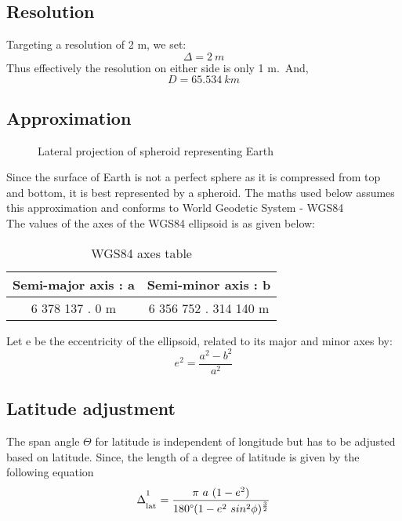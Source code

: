 \documentclass[conference]{IEEEtran}
\begin{document}
\subsection{Resolution}
Targeting a resolution of 2 m, we set:
\begin{equation}\Delta = 2 \ m\end{equation}
Thus effectively the resolution on either side is only 1 m.\
And,
\begin{equation}D = 65.534\ km\end{equation}

\subsection{Approximation}
\begin{figure}[htbp]
\centerline{}
\caption{Lateral projection of spheroid representing Earth}
\label{Spheroid}
\end{figure}
Since the surface of Earth is not a perfect sphere as it is compressed from top and bottom, it is best represented by a spheroid.
The maths used below assumes this approximation and conforms to World Geodetic System - WGS84\cite{b1}\\
The values of the axes of the WGS84 ellipsoid is as given below:
\begin{table}[h!]
\caption{WGS84 axes table}
\begin{center}
\bgroup
\def\arraystretch{1.4}%
\begin{tabular}{c|c}
\textbf{Semi-major axis : a} & \textbf{Semi-minor axis : b} \\
\hline
6 378 137 . 0 m & 6 356 752 . 314 140 m\\
\end{tabular}
\egroup
\end{center} \end{table}

Let e be the eccentricity of the ellipsoid, related to its major and minor axes by:
\begin{equation}e^2 =  \frac{a^2-b^2}{a^2}\end{equation}

\subsection{Latitude adjustment}
The span angle $\Theta$ for latitude is independent of longitude but has to be adjusted based on latitude.
Since, the length of a degree of latitude is given by the following equation\cite{b2}
\begin{equation}\Delta^\textsuperscript{1}_\textsubscript{lat}=\frac{\pi \ a \ (1 - e^2)} {180\degree (1 - e\textsuperscript{2} \ sin\textsuperscript{2}\phi)^\frac{3}{2}}\end{equation}
\end{document}
